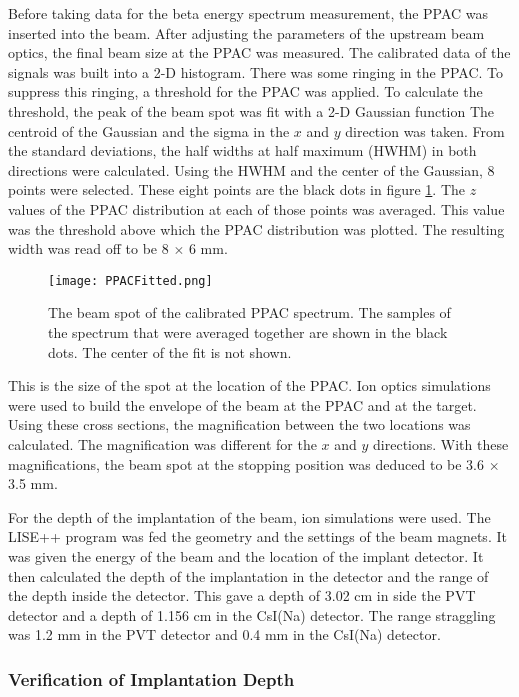 \documentclass[../MaxHughesThesis.tex]{subfiles}
\begin{document}
Before taking data for the beta energy spectrum measurement, the PPAC was inserted into the beam.
After adjusting the parameters of the upstream beam optics, the final beam size at the PPAC was measured.
The calibrated data of the signals was built into a 2-D histogram.
There was some ringing in the PPAC.
To suppress this ringing, a threshold for the PPAC was applied. 
To calculate the threshold, the peak of the beam spot was fit with a 2-D Gaussian function
The centroid of the Gaussian and the sigma in the $x$ and $y$ direction was taken. 
From the standard deviations, the half widths at half maximum (HWHM) in both directions were calculated. 
Using the HWHM and the center of the Gaussian, 8 points were selected.
These eight points are the black dots in figure \ref{fig:PPACSpotch}.
The $z$ values of the PPAC distribution at each of those points was averaged.
This value was the threshold above which the PPAC distribution was plotted.  
The resulting width was read off to be 8 $\times$ 6 mm.

\begin{figure}
	\centerline{\texttt{[image: PPACFitted.png]}}
	\caption{The beam spot of the calibrated PPAC spectrum. 
		 The samples of the spectrum that were averaged together are shown in the black dots.
		 The center of the fit is not shown.}
	\label{fig:PPACSpotch}
\end{figure}  

This is the size of the spot at the location of the PPAC. 
Ion optics simulations were used to build the envelope of the beam at the PPAC and at the target.
Using these cross sections, the magnification between the two locations was calculated.
The magnification was different for the $x$ and $y$ directions.
With these magnifications, the beam spot at the stopping position was deduced to be 3.6 $\times$ 3.5 mm.  

For the depth of the implantation of the beam, ion simulations were used. 
The LISE++ program was fed the geometry and the settings of the beam magnets. 
It was given the energy of the beam and the location of the implant detector. 
It then calculated the depth of the implantation in the detector and the range of the depth inside the detector. 
This gave a depth of 3.02 cm in side the PVT detector and a depth of 1.156 cm in the CsI(Na) detector. 
The range straggling was 1.2 mm in the PVT detector and 0.4 mm in the CsI(Na) detector.

\subsubsection{Verification of Implantation Depth}
\end{document}
